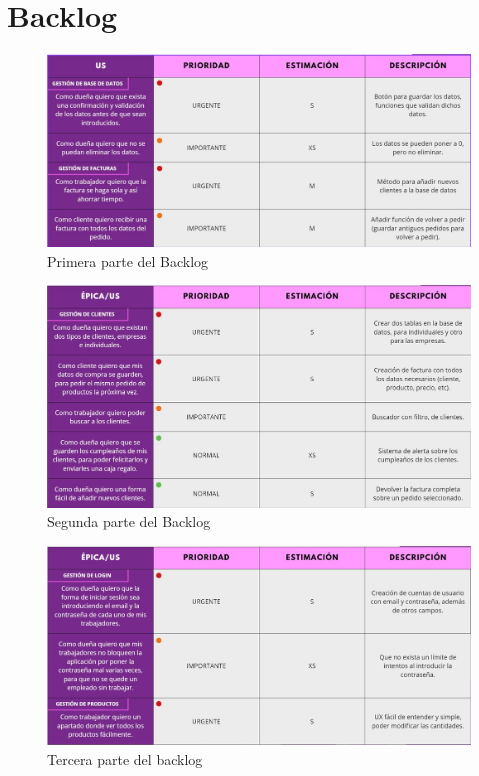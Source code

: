 \chapter{Backlog}

\begin{figure}[h]
    \centering
    \includegraphics[width=1\textwidth]{figures/backlog-1.jpeg}
    \caption{Primera parte del Backlog}
    \label{fig:backlog1}
\end{figure}

\begin{figure}[h]
    \centering
    \includegraphics[width=1\textwidth]{figures/backlog-2.jpeg}
    \caption{Segunda parte del Backlog}
    \label{fig:backlog2}
\end{figure}

\begin{figure}[h]
    \centering
    \includegraphics[width=1\textwidth]{figures/backlog-3.jpeg}
    \caption{Tercera parte del backlog}
    \label{fig:backlog3}
\end{figure}

